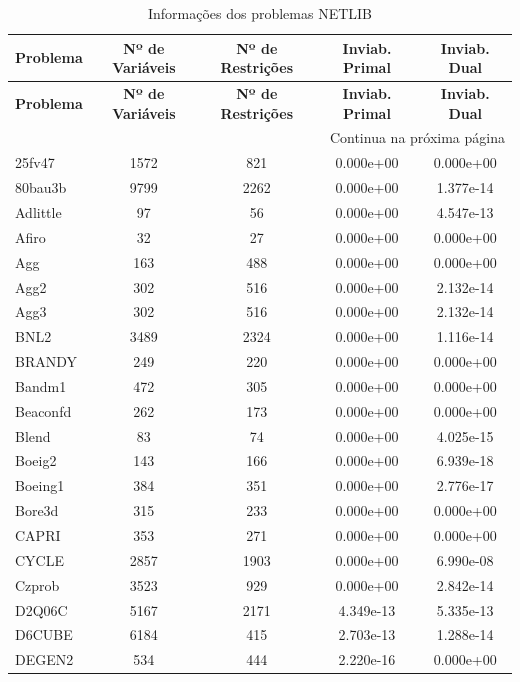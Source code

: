 \documentclass[12pt,a4paper]{article}
\begin{document}
\scriptsize
\begin{longtable}{@{}l|cccc@{}}
\caption{Informações dos problemas NETLIB} \label{tab:info_problemas} \\
\toprule
\textbf{Problema} & \textbf{Nº de Variáveis} & \textbf{Nº de Restrições} & \textbf{Inviab. Primal} & \textbf{Inviab. Dual} \\
\midrule
\endfirsthead

\toprule
\textbf{Problema} & \textbf{Nº de Variáveis} & \textbf{Nº de Restrições} & \textbf{Inviab. Primal} & \textbf{Inviab. Dual} \\
\midrule
\endhead

\midrule \multicolumn{5}{r}{{Continua na próxima página}} \\ \midrule
\endfoot

\bottomrule
\endlastfoot
25fv47 & 1572 & 821 & 0.000e+00 & 0.000e+00 \\
80bau3b & 9799 & 2262 & 0.000e+00 & 1.377e-14 \\
Adlittle & 97 & 56 & 0.000e+00 & 4.547e-13 \\
Afiro & 32 & 27 & 0.000e+00 & 0.000e+00 \\
Agg & 163 & 488 & 0.000e+00 & 0.000e+00 \\
Agg2 & 302 & 516 & 0.000e+00 & 2.132e-14 \\
Agg3 & 302 & 516 & 0.000e+00 & 2.132e-14 \\
BNL2 & 3489 & 2324 & 0.000e+00 & 1.116e-14 \\
BRANDY & 249 & 220 & 0.000e+00 & 0.000e+00 \\
Bandm1 & 472 & 305 & 0.000e+00 & 0.000e+00 \\
Beaconfd & 262 & 173 & 0.000e+00 & 0.000e+00 \\
Blend & 83 & 74 & 0.000e+00 & 4.025e-15 \\
Boeig2 & 143 & 166 & 0.000e+00 & 6.939e-18 \\
Boeing1 & 384 & 351 & 0.000e+00 & 2.776e-17 \\
Bore3d & 315 & 233 & 0.000e+00 & 0.000e+00 \\
CAPRI & 353 & 271 & 0.000e+00 & 0.000e+00 \\
CYCLE & 2857 & 1903 & 0.000e+00 & 6.990e-08 \\
Czprob & 3523 & 929 & 0.000e+00 & 2.842e-14 \\
D2Q06C & 5167 & 2171 & 4.349e-13 & 5.335e-13 \\
D6CUBE & 6184 & 415 & 2.703e-13 & 1.288e-14 \\
DEGEN2 & 534 & 444 & 2.220e-16 & 0.000e+00 \\

\end{longtable}
\end{document}
